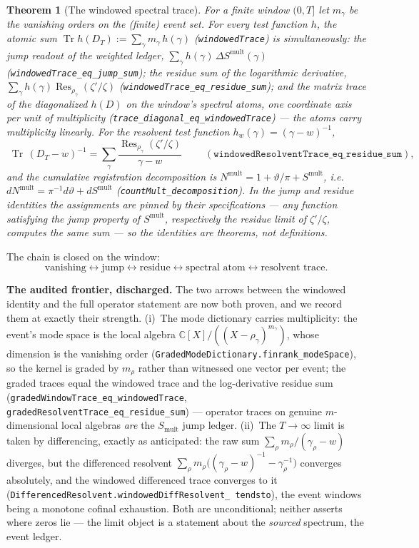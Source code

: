 \documentclass[11pt]{article}
\newtheorem{theorem}{Theorem}
\theoremstyle{definition}
\begin{document}
\begin{theorem}[The windowed spectral trace]\label{thm:windowed-trace}
For a finite window \((0,T]\) let \(m_\gamma\) be the vanishing orders on the
(finite) event set.  For every test function \(h\), the atomic sum
\(\operatorname{Tr}h(D_T):=\sum_{\gamma}m_\gamma\,h(\gamma)\)
(\texttt{windowedTrace}) is simultaneously: the jump readout of the weighted
ledger, \(\sum_\gamma h(\gamma)\,\Delta S^{\mathrm{mult}}(\gamma)\)
(\texttt{windowedTrace\_eq\_jump\_sum}); the residue sum of the logarithmic
derivative,
\(\sum_\gamma h(\gamma)\operatorname{Res}_{\rho_\gamma}(\zeta'/\zeta)\)
(\texttt{windowedTrace\_eq\_residue\_sum}); and the matrix trace of the
diagonalized \(h(D)\) on the window's spectral atoms, one coordinate axis per
unit of multiplicity (\texttt{trace\_diagonal\_eq\_windowedTrace}) --- the
atoms carry multiplicity linearly.  For the resolvent test function
\(h_w(\gamma)=(\gamma-w)^{-1}\),
\[
\boxed{\;
\operatorname{Tr}\,(D_T-w)^{-1}
=\sum_{\gamma}\frac{\operatorname{Res}_{\rho_\gamma}(\zeta'/\zeta)}{\gamma-w}
\;}
\qquad(\texttt{windowedResolventTrace\_eq\_residue\_sum}),
\]
and the cumulative registration decomposition is
\(N^{\mathrm{mult}}=1+\vartheta/\pi+S^{\mathrm{mult}}\), i.e.
\(dN^{\mathrm{mult}}=\pi^{-1}d\vartheta+dS^{\mathrm{mult}}\)
(\texttt{countMult\_decomposition}).  In the jump and residue identities the
assignments are pinned by their specifications --- any function satisfying the
jump property of \(S^{\mathrm{mult}}\), respectively the residue limit of
\(\zeta'/\zeta\), computes the same sum --- so the identities are theorems,
not definitions.
\end{theorem}

The chain is closed on the window:
\[
\boxed{
\text{vanishing}
\leftrightarrow
\text{jump}
\leftrightarrow
\text{residue}
\leftrightarrow
\text{spectral atom}
\leftrightarrow
\text{resolvent trace}.
}
\]

\noindent\textbf{The audited frontier, discharged.}  The two arrows between the
windowed identity and the full operator statement are now both proven, and we
record them at exactly their strength.  (i)~The mode dictionary carries
multiplicity: the event's mode space is the local algebra
\(\mathbb C[X]/((X-\rho_\gamma)^{m_\gamma})\), whose dimension is the vanishing
order (\texttt{GradedModeDictionary.finrank\_modeSpace}), so the kernel is
graded by \(m_\rho\) rather than witnessed one vector per event; the graded
traces equal the windowed trace and the log-derivative residue sum
(\texttt{gradedWindowTrace\_eq\_windowedTrace},
\texttt{gradedResolventTrace\_eq\_residue\_sum}) --- operator traces on genuine
\(m\)-dimensional local algebras \emph{are} the \(S_{\mathrm{mult}}\) jump
ledger.  (ii)~The \(T\to\infty\) limit is taken by differencing, exactly as
anticipated: the raw sum \(\sum_\rho m_\rho/(\gamma_\rho-w)\) diverges, but the
differenced resolvent \(\sum_\rho m_\rho\bigl((\gamma_\rho-w)^{-1}
-\gamma_\rho^{-1}\bigr)\) converges absolutely, and the windowed differenced
trace converges to it (\texttt{DifferencedResolvent.windowedDiffResolvent\_%
tendsto}), the event windows being a monotone cofinal exhaustion.  Both are
unconditional; neither asserts where zeros lie --- the limit object is a
statement about the \emph{sourced} spectrum, the event ledger.
\end{document}
